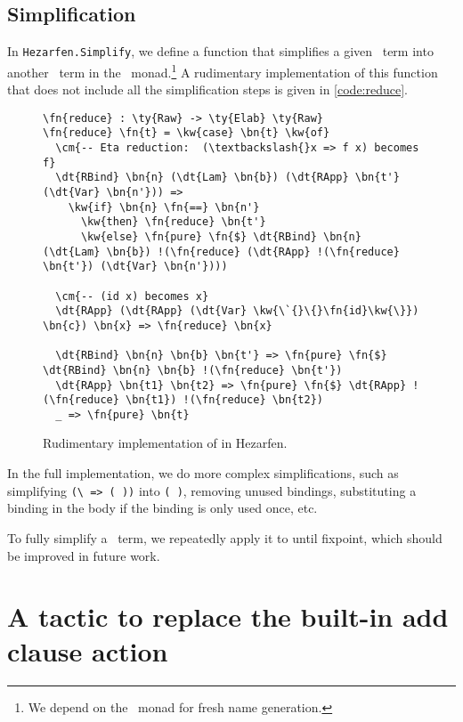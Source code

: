 \subsection{Simplification}

In \texttt{Hezarfen.Simplify}, we define a function  that simplifies
a given \Raw\ term into another \Raw\ term in the \Elab\ monad.\footnote{We
depend on the \Elab\ monad for fresh name generation.}
A rudimentary implementation of this function that does not include all the
simplification steps is given in \autoref{code:reduce}.

\begin{figure}[ht]
\caption{Rudimentary implementation of  in Hezarfen.}
\begin{Verbatim}[framesep=2mm, label=\footnotesize{\normalfont{Idris}}, labelposition=topline]
\fn{reduce} : \ty{Raw} -> \ty{Elab} \ty{Raw}
\fn{reduce} \fn{t} = \kw{case} \bn{t} \kw{of}
  \cm{-- Eta reduction:  (\textbackslash{}x => f x) becomes f}
  \dt{RBind} \bn{n} (\dt{Lam} \bn{b}) (\dt{RApp} \bn{t'} (\dt{Var} \bn{n'})) =>
    \kw{if} \bn{n} \fn{==} \bn{n'}
      \kw{then} \fn{reduce} \bn{t'}
      \kw{else} \fn{pure} \fn{$} \dt{RBind} \bn{n} (\dt{Lam} \bn{b}) !(\fn{reduce} (\dt{RApp} !(\fn{reduce} \bn{t'}) (\dt{Var} \bn{n'})))

  \cm{-- (id x) becomes x}
  \dt{RApp} (\dt{RApp} (\dt{Var} \kw{\`{}\{}\fn{id}\kw{\}}) \bn{c}) \bn{x} => \fn{reduce} \bn{x}

  \dt{RBind} \bn{n} \bn{b} \bn{t'} => \fn{pure} \fn{$} \dt{RBind} \bn{n} \bn{b} !(\fn{reduce} \bn{t'})
  \dt{RApp} \bn{t1} \bn{t2} => \fn{pure} \fn{$} \dt{RApp} !(\fn{reduce} \bn{t1}) !(\fn{reduce} \bn{t2})
  _ => \fn{pure} \bn{t}
\end{Verbatim}
\end{figure}

In the full implementation, we do more complex simplifications, such as
simplifying \texttt{(\textbackslash{} =>  ( ))} into
\texttt{(  )}, removing unused  bindings,
substituting a  binding in the body if the binding is only used once,
etc.

To fully simplify a \Raw\ term, we repeatedly apply it to  until
fixpoint, which should be improved in future work.

\section{A tactic to replace the built-in add clause action}\label{sec:addClause}



